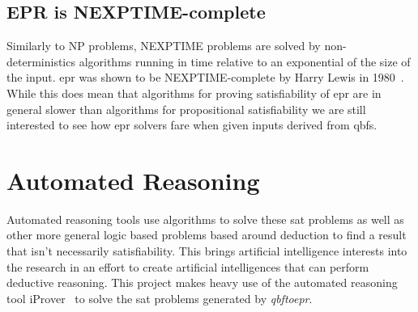 \subsection{EPR is NEXPTIME-complete}
Similarly to NP problems, NEXPTIME problems are solved by non-deterministics algorithms running in time relative to an exponential of the size of the input. \Gls{epr} was shown to be NEXPTIME-complete by Harry Lewis in 1980~\cite{harrylewis}. While this does mean that algorithms for proving satisfiability of \gls{epr} are in general slower than algorithms for propositional satisfiability we are still interested to see how \gls{epr} solvers fare when given inputs derived from \glspl{qbf}.

\section{Automated Reasoning}
Automated reasoning tools use algorithms to solve these \gls{sat} problems as well as other more general logic based problems based around deduction to find a result that isn't necessarily satisfiability. This brings artificial intelligence interests into the research in an effort to create artificial intelligences that can perform deductive reasoning. This project makes heavy use of the automated reasoning tool iProver~\cite{iprover} to solve the \gls{sat} problems generated by \textit{qbftoepr}.
